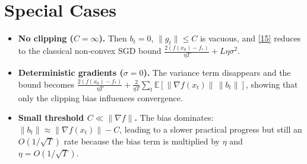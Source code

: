 \documentclass{article}
\newcommand{\E}{\mathbb{E}}
\begin{document}
\section*{Special Cases}
\begin{itemize}
\item \textbf{No clipping ($C=\infty$).}
  Then $b_{t}=0$, $\|g_{t}\|\le C$ is vacuous, and \eqref{15} reduces to the
  classical non‑convex SGD bound
  $\frac{2(f(x_{0})-f_{*})}{\eta T}+L\eta\sigma^{2}$.

\item \textbf{Deterministic gradients ($\sigma=0$).}
  The variance term disappears and the bound becomes
  $\frac{2(f(x_{0})-f_{*})}{\eta T}
  +\frac{2}{\eta T}\sum_{t}\E[\|\nabla f(x_{t})\|\,\|b_{t}\|]$,
  showing that only the clipping bias influences convergence.

\item \textbf{Small threshold $C\ll \|\nabla f\|$.}
  The bias dominates: $\|b_{t}\|\approx\|\nabla f(x_{t})\|-C$,
  leading to a slower practical progress but still an $O(1/\sqrt{T})$
  rate because the bias term is multiplied by $\eta$ and $\eta=O(1/\sqrt{T})$.
\end{itemize}
\end{document}
